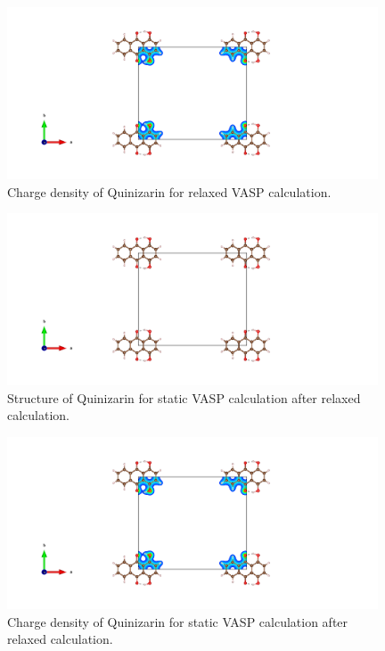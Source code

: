\documentclass{article}
\begin{document}
  \begin{figure}[H]
      \centering
      \includegraphics[width = 11cm]{../fig/basic_relax_CHGCAR.png}
      \caption{Charge density of Quinizarin for relaxed VASP calculation. }
      \label{fig:basic_relax_CHGCAR}
  \end{figure}

  \begin{figure}[H]
      \centering
      \includegraphics[width = 11cm]{../fig/basic_staticafter_CONTCAR.png}
      \caption{Structure of Quinizarin for static VASP calculation after relaxed calculation. }
      \label{fig:basic_staticafter_CONTCAR}
  \end{figure}

  \begin{figure}[H]
      \centering
      \includegraphics[width = 11cm]{../fig/basic_staticafter_CHGCAR.png}
      \caption{Charge density of Quinizarin for static VASP calculation after relaxed calculation. }
      \label{fig:basic_staticafter_CHGCAR}
  \end{figure}
\end{document}
